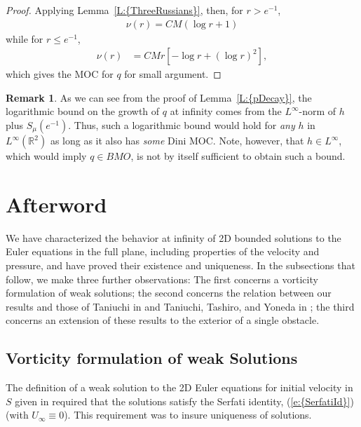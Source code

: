 \documentclass[reqno,openright,11pt,twoside]{amsart}
\theoremstyle{definition}
\newtheorem{remark}[theorem]{Remark}
\numberwithin{equation}{section}
\begin{document}
\begin{proof}
Applying {Lemma~\ref{L:{ThreeRussians}}}, then, for $r > e^{-1}$,
\begin{align}\label{e:nuLargeArg}
	\nu(r)
		= C M {\ensuremath{\left( {\log r + 1} \right) }}
\end{align}
while for $r \le e^{-1}$,
\begin{align*}
	\nu(r)
		&= C M r {\ensuremath{\left[ {- \log r + (\log r)^2} \right]}},
\end{align*}
which gives the MOC for $q$ for small argument.
\end{proof}

\begin{remark}
    As we can see from the proof of {Lemma~\ref{L:{pDecay}}}, the logarithmic
    bound on the growth of $q$ at infinity comes from the
    $L^{\ensuremath{\infty}}$-norm of $h$ plus $S_\mu(e^{-1})$. Thus, such
    a logarithmic bound would hold for \textit{any} $h$ in
    $L^{\ensuremath{\infty}}({\ensuremath{{\ensuremath{\mathbb{{R}}}}}}^2)$ as long as it also has \textit{some} Dini
    MOC. Note, however,
    that $h \in L^{\ensuremath{\infty}}$, which would imply $q \in BMO$, is not
    by itself sufficient to obtain such a bound.
\end{remark}

	

\section{Afterword}\label{S:Afterword}

\noindent We have characterized the behavior at infinity of 2D bounded solutions to the Euler equations in the full plane, including properties of the velocity and pressure, and have proved their existence and uniqueness. In the subsections that follow, we make three further observations: The first concerns a vorticity formulation of weak solutions; the second concerns the relation between our results and those of Taniuchi in \cite{Taniuchi2004} and Taniuchi, Tashiro, and Yoneda in \cite{TaniuchiEtAl2010}; the third concerns an extension of these results to the exterior of a single obstacle.

\subsection{Vorticity formulation of weak Solutions}\label{S:VorticityFormulation} The definition of a weak solution to the 2D Euler equations for initial velocity in $S$ given in \cite{AKLL2014} required that the solutions satisfy the Serfati identity, {(\ref{e:{SerfatiId}})} (with $U_{\ensuremath{\infty}} \equiv 0$). This requirement was to insure uniqueness of solutions.
\end{document}
